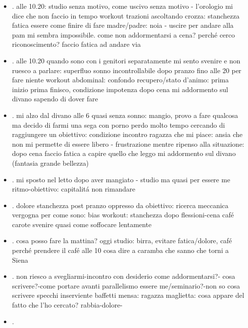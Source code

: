 \begin{itemize}
\item {}.
alle 10.20: studio senza motivo, come uscivo senza motivo - l'orologio mi dice che non faccio in tempo
workout trazioni ascoltando crozza: stanchezza fatica essere come finire di fare
madre/padre: noia - uscire per andare alla pam mi sembra impossibile.
come non addormentarsi a cena?
perch\'e cerco riconoscimento?
faccio fatica ad andare via
\item {}.
alle 10.20
quando sono con i genitori separatamente mi sento svenire e non ruesco a parlare: superfluo
sonno incontrollabile dopo pranzo
fino alle 20 per fare niente
workout abdominal: confondo recupero/stato d'animo: prima inizio prima finisco, condizione impotenza
dopo cena mi addormento sul divano sapendo di dover fare
\item {}.
mi alzo dal divano alle 6 quasi senza sonno: mangio, provo a fare qualcosa ma decido di farmi una sega con porno
perdo molto tempo cercando di raggiungere un obiettivo: 
condizione incontro ragazza che mi piace: ansia che non mi permette di essere libero - frustrazione mentre ripenso alla situazione: 
dopo cena faccio fatica a capire quello che leggo
mi addormento sul divano (fantasia grande bellezza)
\item {}.
mi sposto nel letto dopo aver mangiato - studio ma quasi per essere me
ritmo-obiettivo: capitalit\'a non rimandare
\item {}.
dolore stanchezza post pranzo
oppresso da obiettivo: ricerca meccanica 
vergogna per come sono: bias
workout: stanchezza dopo flessioni-cena caf\'e carote svenire quasi come soffocare lentamente
\item {}.
cosa posso fare la mattina?
oggi studio: birra, evitare fatica/dolore, caf\'e
perch\'e prendere il caf\'e alle 10
cosa dire a caramba che sanno che torni a Siena
\item {}.
non riesco a svegliarmi-incontro con desiderio come addormentarsi?-
cosa scrivere?-come portare avanti parallelismo essere me/seminario?-non so cosa scrivere
specchi inserviente baffetti mensa: ragazza maglietta: cosa appare del fatto che l'ho cercato?
rabbia-dolore-
\item {}.

\end{itemize}
